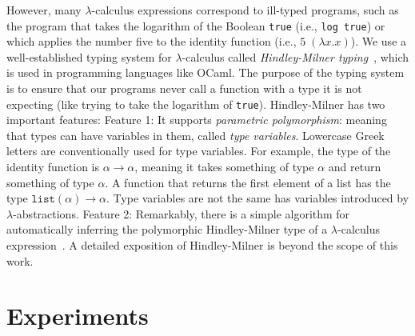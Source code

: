 \documentclass{article}
\begin{document}
However, many $\lambda$-calculus expressions correspond to ill-typed programs, such as the program that takes the logarithm of the Boolean \texttt{true} (i.e., \texttt{log true}) or which applies the number five to the identity function
(i.e., $5 \; (\lambda x.x)$).
We use a well-established typing system for $\lambda$-calculus called \emph{Hindley-Milner typing}~\cite{pierce}, which is used in programming languages like OCaml.
The purpose of the typing system is to ensure that our programs never call a function with a type it is not expecting (like trying to take the logarithm of \texttt{true}).
Hindley-Milner has two important features:
Feature 1: It supports \emph{parametric polymorphism}: meaning that types can have variables in them, called \emph{type variables}. Lowercase Greek letters are conventionally used for  type variables.
For example, the type of the identity function is $\alpha\to\alpha$, meaning it takes something of type $\alpha$ and return something of type $\alpha$. A function that returns the first element of a list has the type $\texttt{list}(\alpha)\to\alpha$. Type variables are not the same has variables introduced by $\lambda$-abstractions.
Feature 2: Remarkably, there is a  simple algorithm for automatically inferring the polymorphic Hindley-Milner type of a $\lambda$-calculus expression~\cite{damas1982principal}.
A detailed exposition of Hindley-Milner is beyond the scope of this work.




\section{Experiments}
\end{document}
